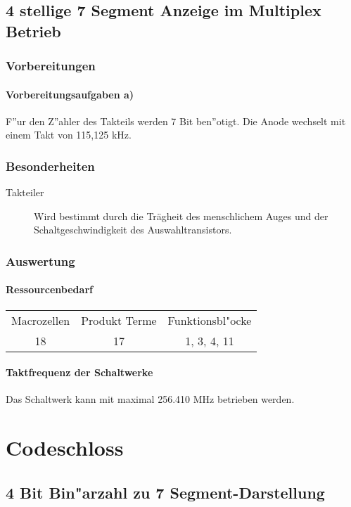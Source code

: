 \documentclass [] {scrartcl}
\begin{document}
  \subsection{4 stellige 7 Segment Anzeige im Multiplex Betrieb}
  \subsubsection{Vorbereitungen}
  \paragraph{Vorbereitungsaufgaben a)}
  F''ur den Z''ahler des Takteils werden 7 Bit ben''otigt. Die Anode wechselt mit einem Takt von 115,125 kHz.
  \subsubsection{Besonderheiten}
  \begin{description}
    \item[Takteiler] Wird bestimmt durch die Trägheit des menschlichem Auges und der Schaltgeschwindigkeit des Auswahltransistors.
  \end{description}
  \subsubsection{Auswertung}
  \paragraph{Ressourcenbedarf}
  \begin{table}
    \begin{tabular}{ccc}
      Macrozellen & Produkt Terme & Funktionsbl"ocke\\
      18 & 17 & 1, 3, 4, 11\\
    \end{tabular}
  \end{table}
  \paragraph{Taktfrequenz der Schaltwerke}
  Das Schaltwerk kann mit maximal 256.410 MHz betrieben werden.


  \section{Codeschloss}
  \subsection{4 Bit Bin"arzahl zu 7 Segment-Darstellung}
\end{document}

